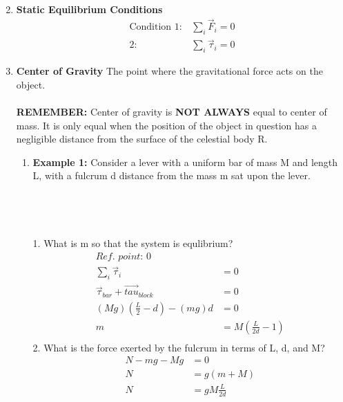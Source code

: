 \documentclass{article}
\begin{document}
\begin{enumerate}
\begin{enumerate}
\begin{align*}
                \end{align*}
            \end{enumerate}
            \item \textbf{Static Equilibrium Conditions}
            \begin{align*}
                \text{Condition }1:&\sum_i\vec{F}_i=0 \\
                2:&\sum_i\vec{\tau}_i=0
            \end{align*}
            \item \textbf{Center of Gravity} 
            The point where the gravitational force acts on the object. \\ \\
            \textbf{REMEMBER:} Center of gravity is \textbf{NOT ALWAYS} equal to center of mass. It is only equal when the position of the object in question has a negligible distance from the surface of the celestial body R. \\
            \begin{enumerate}
                \item \textbf{Example 1:}
                Consider a lever with a uniform bar of mass M and length L, with a fulcrum d distance from the mass m sat upon the lever. \\
                \\\\\\\\1. What is m so that the system is equlibrium?
                \begin{align*}
                    \textit{Ref. point: }0 \\
                    \sum_i\vec{\tau}_i&=0 \\
                    \vec{\tau}_{bar}+\vec{tau}_{block}&=0 \\
                    (Mg)(\frac{L}{2}-d)-(mg)d&=0 \\
                    m&=M(\frac{L}{2d}-1) \\
                \end{align*}
                2. What is the force exerted by the fulcrum in terms of L, d, and M?
                \begin{align*}
                    N-mg-Mg&=0 \\
                    N&=g(m+M) \\
                    N&=gM\frac{L}{2d} \\
                \end{align*}
            \end{enumerate}
        \end{enumerate}
\end{document}
